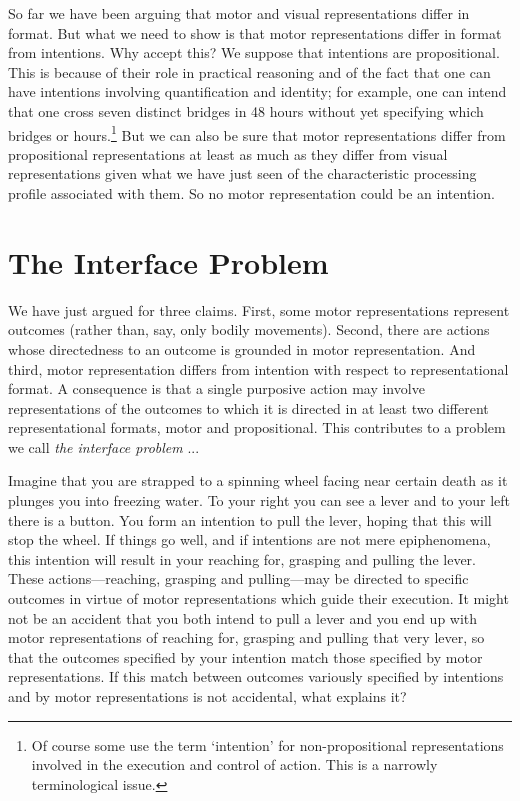 \documentclass[12pt,\papersize]{extarticle}
\begin{document}
So far we have been arguing that motor and visual representations differ in format.  
But what we need to show is that motor representations differ in format from intentions.
Why accept this?
We suppose that intentions are propositional. 
This is because of their role in practical reasoning and of the fact that one can have intentions involving quantification and identity; for example, one can intend that one cross seven distinct bridges in 48 hours without yet specifying which bridges or hours.\footnote{ Of course some use the term `intention' for non-propositional representations involved in the execution and control of action.  This is a narrowly terminological issue.} 
But we can also be sure that motor representations differ from propositional representations at least as much as they differ from visual representations given what we have just seen of the characteristic processing profile associated with them.
So no motor representation could be an intention.


\section{The Interface Problem}

We have just argued for three claims. First, some motor representations represent outcomes (rather than, say, only bodily movements). Second, there are actions whose directedness to an outcome is grounded in motor representation. And third, motor representation differs from intention with respect to representational format. A consequence is that a single purposive action may involve representations of the outcomes to which it is directed in at least two different representational formats, motor and propositional. This contributes to a problem we call \emph{the interface problem} ... 

Imagine that you are strapped to a spinning wheel facing near certain death as it plunges you into freezing water. To your right you can see a lever and to your left there is a button. 
You form an intention to pull the lever, hoping that this will stop the wheel. If things go well, and if intentions are not mere epiphenomena, this intention will result in your reaching for, grasping and pulling the lever. These actions---reaching, grasping and pulling---may be directed to specific outcomes in virtue of motor representations which guide their execution. It might not be an accident that you both intend to pull a lever and you end up with motor representations of reaching for, grasping and pulling that very lever, so that the outcomes specified by your intention match those specified by motor representations. If this match between outcomes variously specified by intentions and by motor representations is not  accidental, what explains it?  
\end{document}
